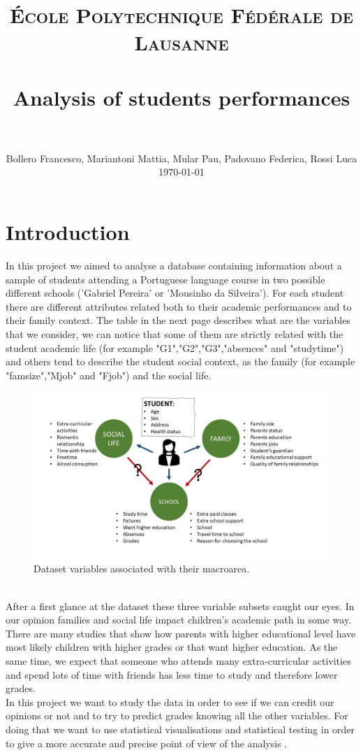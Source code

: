 \documentclass[a4paper, 11pt]{report}
\title{
		\usefont{OT1}{bch}{b}{n}
		\normalfont \normalsize \textsc{École Polytechnique Fédérale de Lausanne} \\ [25pt]
		\horrule{0.5pt} \\[0.4cm]
		\huge Analysis of students performances \\
		\horrule{2pt} \\[0.5cm]
}
\author{
		\normalfont 								\normalsize
        Bollero Francesco, Mariantoni Mattia, Mular Pau, Padovano Federica, Rossi Luca\\[-3pt]		\normalsize
        \today
}
\date{}
\theoremstyle{definition}
\numberwithin{equation}{section}		%
\numberwithin{figure}{section}			%
\numberwithin{table}{section}				%
\begin{document}
\maketitle
\section{Introduction}
In this project we aimed to analyse a database containing information about a sample of students attending a Portuguese language course in two possible different schools ('Gabriel Pereira' or 'Mousinho da Silveira'). For each student there are different attributes related both to their academic performances and to their family context. The table in the next page describes what are the variables that we consider, we can notice that some of them are strictly related with the student academic life (for example "G1","G2","G3","absences" and "studytime") and others tend to describe the student social context, as the family (for example "famsize","Mjob" and "Fjob") and the social life.
 
\begin{figure}[h]\centering
\includegraphics[scale=0.4]{variables.jpg}
\caption{Dataset variables associated with their macroarea.}
\end{figure}

\\After a first glance at the dataset these three variable subsets caught our eyes. In our opinion families and social life impact children's academic path in some way. There are many studies that show how parents with higher educational level have most likely children with higher grades or that want higher education. As the same time, we expect that someone who attends many extra-curricular activities and spend lots of time with friends has less time to study and therefore lower grades. 
\\In this project we want to study the data in order to see if we can credit our opinions or not and to try to predict grades knowing all the other variables. For doing that we want to use statistical visualisations and statistical testing in order to give a more accurate and precise point of view of the analysis .
\end{document}
